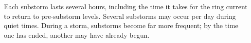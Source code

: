 Each substorm lasts several hours, including the time it takes for the ring current to return to pre-substorm levels. Several substorms may occur per day during quiet times. During a storm, substorms become far more frequent; by the time one has ended, another may have already begun. 




